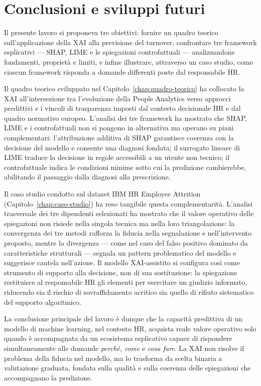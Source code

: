 \chapter{Conclusioni e sviluppi futuri}
\label{chap:conclusioni}

Il presente lavoro si proponeva tre obiettivi: fornire un quadro teorico sull'applicazione della XAI alla previsione del turnover, confrontare tre framework esplicativi --- SHAP, LIME e le spiegazioni controfattuali --- analizzandone fondamenti, proprietà e limiti, e infine illustrare, attraverso un caso studio, come ciascun framework risponda a domande differenti poste dal responsabile HR.

Il quadro teorico sviluppato nel Capitolo~\ref{chap:quadro-teorico} ha collocato la XAI all'intersezione tra l'evoluzione della People Analytics verso approcci predittivi e i vincoli di trasparenza imposti dal contesto decisionale HR e dal quadro normativo europeo. L'analisi dei tre framework ha mostrato che SHAP, LIME e i controfattuali non si pongono in alternativa ma operano su piani complementari: l'attribuzione additiva di SHAP garantisce coerenza con la decisione del modello e consente una diagnosi fondata; il surrogato lineare di LIME traduce la decisione in regole accessibili a un utente non tecnico; il controfattuale indica le condizioni minime sotto cui la predizione cambierebbe, abilitando il passaggio dalla diagnosi alla prescrizione.

Il caso studio condotto sul dataset IBM HR Employee Attrition (Capitolo~\ref{chap:caso-studio}) ha reso tangibile questa complementarità. L'analisi trasversale dei tre dipendenti selezionati ha mostrato che il valore operativo delle spiegazioni non risiede nella singola tecnica ma nella loro triangolazione: la convergenza dei tre metodi rafforza la fiducia nella segnalazione e nell'intervento proposto, mentre la divergenza --- come nel caso del falso positivo dominato da caratteristiche strutturali --- segnala un pattern problematico del modello e suggerisce cautela nell'azione. Il modello XAI-assistito si configura così come strumento di supporto alla decisione, non di sua sostituzione: la spiegazione restituisce al responsabile HR gli elementi per esercitare un giudizio informato, riducendo sia il rischio di sovraffidamento acritico sia quello di rifiuto sistematico del supporto algoritmico.

La conclusione principale del lavoro è dunque che la capacità predittiva di un modello di machine learning, nel contesto HR, acquista reale valore operativo solo quando è accompagnata da un ecosistema esplicativo capace di rispondere simultaneamente alle domande \emph{perché}, \emph{come} e \emph{cosa fare}. La XAI non risolve il problema della fiducia nel modello, ma lo trasforma da scelta binaria a valutazione graduata, fondata sulla qualità e sulla coerenza delle spiegazioni che accompagnano la predizione.

